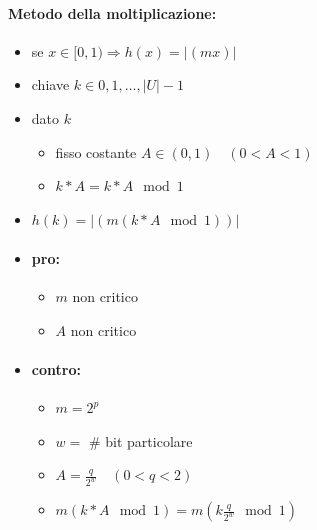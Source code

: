 \paragraph{Metodo della moltiplicazione:}
\begin{itemize}
    \item se $x \in [0,1) \Rightarrow h(x) = |(mx)|$
    \item chiave $k \in 0,1,\ldots,|U|-1$
    \item dato $k$
    \begin{itemize}
        \item fisso costante $A \in (0,1) \quad (0<A<1)$
        \item $k * A = k * A \mod 1$
    \end{itemize}
    \item $h(k) = |(m(k*A\mod1))|$
    \item[] \paragraph{pro:}
    \begin{itemize}
        \item $m$ non critico
        \item $A$ non critico
    \end{itemize}
    \item[] \paragraph{contro:}
    \begin{itemize}
        \item $m = 2^p$
        \item $w =$ \# bit particolare
        \item $A = \frac{q}{2^w} \quad (0<q<2)$
        \item $m(k * A \mod 1) = m(k \frac{q}{2^w} \mod 1)$
    \end{itemize}
\end{itemize}
